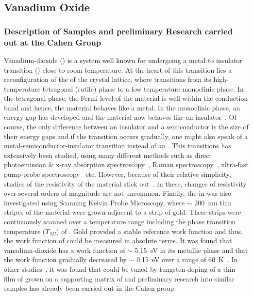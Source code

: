 \subsection{Vanadium Oxide}
\label{sec:vox}
\subsubsection{Description of Samples and preliminary Research carried out at the Cahen Group}
Vanadium-dioxide (\vadiox{}) is a system well known for undergoing a metal to insulator transition (\mit{}) close to room temperature. At the heart of this transition lies a reconfiguration of the of the crystal lattice, where \vadiox{} transitions from its high-temperature tetragonal (rutile) phase to a low temperature monoclinic phase. In the tetragonal phase, the Fermi level of the material is well within the conduction band and hence, the material behaves like a metal. In the monoclinic phase, an energy gap has developed and the material now behaves like an insulator~\cite{nakano_gapopen}. Of course, the only difference between an insulator and a semiconductor is the size of their energy gaps and if the transition occurs gradually, one might also speak of a metal-semiconductor-insulator transition instead of an \mit{}. This transitions has extensively been studied, using many different methods such as direct photoemission \& x-ray absorption spectroscopy~\cite{koethe_expstud}, Raman spectroscopy~\cite{radue_raman}, ultra-fast pump-probe spectroscopy~\cite{jensen_expgap} etc. However, because of their relative simplicity, studies of the resistivity of the material stick out~\cite{shibuya_physlet}. In these, changes of resistivity over several orders of magnitude are not uncommon. Finally, the \mit{} in \vadiox{} was also investigated using Scanning Kelvin Probe Microscopy, where $\sim$ \SI{200}{\nano\metre} thin stripes of the material were grown adjacent to a strip of gold. These strips were continuously scanned over a temperature range including the phase transition temperature ($T_{MI}$) of \vadiox{}. Gold provided a stable reference work function and thus, the work function of \vadiox{} could be measured in absolute terms. It was found that vanadium-dioxide has a work function of $\sim$ \SI{5.15}{\electronvolt} in its metallic phase and that the work function gradually decreased by $\sim$ \SI{0.15}{\electronvolt} over a range of \SI{60}{\kelvin}~\cite{ko_kp}. In other studies~\cite{shibuya_physrev}, it was found that \mit{} could be tuned by tungsten-doping of a thin film of \vadiox{} grown on a supporting matrix of \tiox{} and preliminary research into similar samples has already been carried out in the Cahen group.\\
